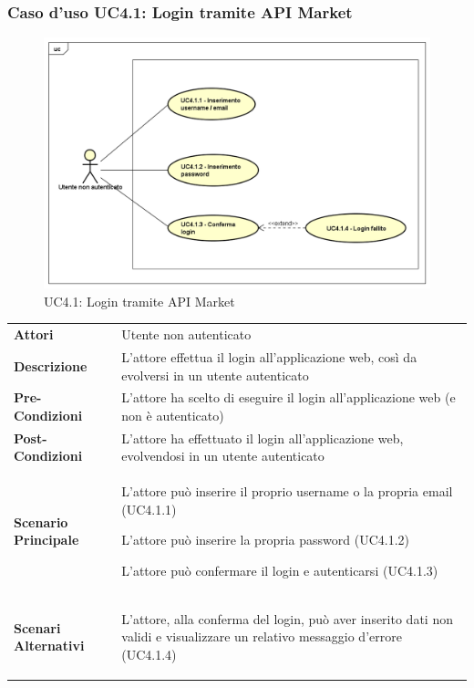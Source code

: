 \newpage
\subsubsection{Caso d'uso UC4.1: Login tramite API Market}
\label{UC4_1}
\begin{figure}[!htbp]
	\centering
	\includegraphics[scale=0.45]{UML/UC4_1.png}
	\caption{UC4.1: Login tramite API Market}
\end{figure}

\begin{tabular}{ l | p{11cm}}
	\hline
	\rowcolor{Gray}
	 \multicolumn{2}{c}{UC4.1 - Login tramite API Market} \\
	 \hline
	\textbf{Attori} & Utente non autenticato \\
	\textbf{Descrizione} & L'attore effettua il login all'applicazione web, così da evolversi in un utente autenticato\\
	\textbf{Pre-Condizioni} & L'attore ha scelto di eseguire il login all'applicazione web (e non è autenticato) \\
	\textbf{Post-Condizioni} & L'attore ha effettuato il login all'applicazione web, evolvendosi in un utente autenticato \\
	\textbf{Scenario Principale} & 
	\begin{enumerate*}[label=(\arabic*.),itemjoin={\newline}]
		\item L'attore può inserire il proprio username o la propria email (UC4.1.1)
		\item L'attore può inserire la propria password (UC4.1.2)
		\item L'attore può confermare il login e autenticarsi (UC4.1.3)
	\end{enumerate*}\\
	\textbf{Scenari Alternativi} & 
	\begin{enumerate*}[label=(\arabic*.),itemjoin={\newline}]
		\item L'attore, alla conferma del login, può aver inserito dati non validi e visualizzare un relativo messaggio d'errore (UC4.1.4)
	\end{enumerate*}\\
\end{tabular}


